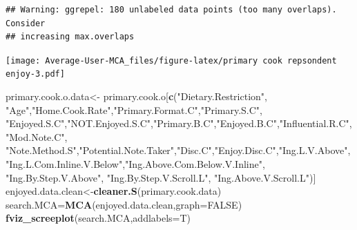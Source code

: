 \documentclass[
]{article}
\newenvironment{Shaded}{\begin{snugshade}}{\end{snugshade}}
\newcommand{\DataTypeTok}[1]{\textcolor[rgb]{0.13,0.29,0.53}{#1}}
\newcommand{\KeywordTok}[1]{\textcolor[rgb]{0.13,0.29,0.53}{\textbf{#1}}}
\newcommand{\NormalTok}[1]{#1}
\newcommand{\OtherTok}[1]{\textcolor[rgb]{0.56,0.35,0.01}{#1}}
\newcommand{\StringTok}[1]{\textcolor[rgb]{0.31,0.60,0.02}{#1}}
\begin{document}
\begin{Shaded}
\end{Shaded}

\begin{verbatim}
## Warning: ggrepel: 180 unlabeled data points (too many overlaps). Consider
## increasing max.overlaps
\end{verbatim}

\texttt{[image: Average-User-MCA\_files/figure-latex/primary cook repsondent enjoy-3.pdf]}

\begin{Shaded}
\begin{Highlighting}[]
\NormalTok{primary.cook.o.data<-}\StringTok{ }\NormalTok{primary.cook.o[}\KeywordTok{c}\NormalTok{(}\StringTok{"Dietary.Restriction"}\NormalTok{, }\StringTok{"Age"}\NormalTok{,}\StringTok{"Home.Cook.Rate"}\NormalTok{,}\StringTok{"Primary.Format.C"}\NormalTok{,}\StringTok{"Primary.S.C"}\NormalTok{,}
            \StringTok{"Enjoyed.S.C"}\NormalTok{,}\StringTok{"NOT.Enjoyed.S.C"}\NormalTok{,}\StringTok{"Primary.B.C"}\NormalTok{,}\StringTok{"Enjoyed.B.C"}\NormalTok{,}\StringTok{"Influential.R.C"}\NormalTok{, }
            \StringTok{"Mod.Note.C"}\NormalTok{, }
            \StringTok{"Note.Method.S"}\NormalTok{,}\StringTok{"Potential.Note.Taker"}\NormalTok{,}\StringTok{"Disc.C"}\NormalTok{,}\StringTok{"Enjoy.Disc.C"}\NormalTok{,}\StringTok{"Ing.L.V.Above"}\NormalTok{,}
            \StringTok{"Ing.L.Com.Inline.V.Below"}\NormalTok{,}\StringTok{"Ing.Above.Com.Below.V.Inline"}\NormalTok{,  }\StringTok{"Ing.By.Step.V.Above"}\NormalTok{,  }\StringTok{"Ing.By.Step.V.Scroll.L"}\NormalTok{,}
            \StringTok{"Ing.Above.V.Scroll.L"}\NormalTok{)]}
\NormalTok{enjoyed.data.clean<-}\KeywordTok{cleaner.S}\NormalTok{(primary.cook.data)}
\NormalTok{search.MCA=}\KeywordTok{MCA}\NormalTok{(enjoyed.data.clean,}\DataTypeTok{graph=}\OtherTok{FALSE}\NormalTok{)}
\KeywordTok{fviz_screeplot}\NormalTok{(search.MCA,}\DataTypeTok{addlabels=}\NormalTok{T)}
\end{Highlighting}
\end{Shaded}
\end{document}
